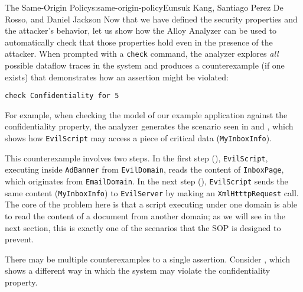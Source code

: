 \begin{aosachapter}{The Same-Origin Policy}{s:same-origin-policy}{Eunsuk Kang, Santiago Perez De Rosso, and Daniel Jackson}
Now that we have defined the security properties and the attacker's
behavior, let us show how the Alloy Analyzer can be used to
automatically check that those properties hold even in the presence of
the attacker. When prompted with a \texttt{check} command, the analyzer
explores \emph{all} possible dataflow traces in the system and produces
a counterexample (if one exists) that demonstrates how an assertion
might be violated:

\begin{verbatim}
check Confidentiality for 5
\end{verbatim}

For example, when checking the model of our example application against
the confidentiality property, the analyzer generates the scenario seen
in  and
, which shows how
\texttt{EvilScript} may access a piece of critical data
(\texttt{MyInboxInfo}).


This counterexample involves two steps. In the first step
(),
\texttt{EvilScript}, executing inside \texttt{AdBanner} from
\texttt{EvilDomain}, reads the content of \texttt{InboxPage}, which
originates from \texttt{EmailDomain}. In the next step
(),
\texttt{EvilScript} sends the same content (\texttt{MyInboxInfo}) to
\texttt{EvilServer} by making an \texttt{XmlHtttpRequest} call. The core
of the problem here is that a script executing under one domain is able
to read the content of a document from another domain; as we will see in
the next section, this is exactly one of the scenarios that the SOP is
designed to prevent.

There may be multiple counterexamples to a single assertion. Consider
, which shows a
different way in which the system may violate the confidentiality
property.



\end{aosachapter}
